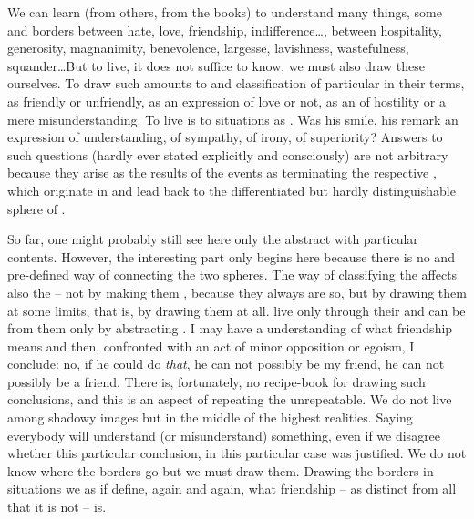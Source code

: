 We can learn (from others, from the books) to understand many things, some
 and borders between hate, love, friendship,
indifference\ldots, between hospitality, generosity, magnanimity, benevolence,
largesse, lavishness, wastefulness, squander\ldots But to live, it does
not suffice to  know, we must also draw these 
ourselves. To draw such  amounts to  and
classification of particular  in their terms, as friendly or
unfriendly, as an expression of love or not, as an  of hostility or a
mere misunderstanding. To live is to  situations as
. Was his smile, his remark an expression of understanding, of
sympathy, of irony, of superiority? Answers to such questions (hardly ever
stated explicitly and consciously) are not arbitrary because they arise as the
results of  the  events as  terminating the
respective , which originate in and lead back to the differentiated
but hardly distinguishable sphere of .

So far, one might probably still see here only  the abstract
 with particular contents. However, the interesting part only begins
here because there is no  and pre-defined way of connecting the two
spheres. The way of classifying the  affects also the
 -- not by making them , because they
always are so, but by drawing them at some  limits, that is, by
drawing them at all.  live only through their 
and can be  from them only by abstracting . I may
have a  understanding of what friendship means and then, confronted
with an act of minor opposition or egoism, I conclude: no, if he could do {\em
  that}, he can not possibly be my friend, he can not possibly be a friend.
There is, fortunately, no recipe-book for drawing such conclusions, and this is
an aspect of repeating the unrepeatable. We do not live among shadowy images but
in the middle of the highest realities. Saying  everybody will
understand (or misunderstand) something, even if we disagree whether this
particular conclusion, in this particular case was justified. We do not know
where the borders go but we must draw them.  Drawing the borders in 
situations we as if define, again and again, what friendship -- as distinct from
all that it is not -- is.

